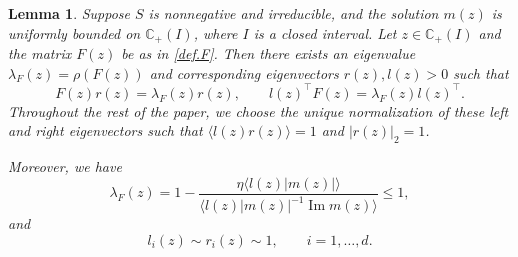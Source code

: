 \documentclass[11pt,twoside, a4paper]{article}
\numberwithin{equation}{section}
\numberwithin{figure}{section}
\theoremstyle{plain} %
\newtheorem{lemma}[theorem]{Lemma}
\theoremstyle{definition}
\theoremstyle{remark}
\newcommand{\1} {\mspace{1 mu}}
\newcommand{\2} {\mspace{2 mu}}
\newcommand{\C} {{\mathbb{C}}}
\newcommand{\Cp} {\mathbb {C}_+}
\DeclareMathOperator{\im}{Im}
\begin{document}
\begin{lemma}\label{lem:F-PF}
  Suppose $S$ is nonnegative and irreducible, and the solution $m(z)$ is uniformly bounded on $\C_+(I)$, where $I$ is a closed interval. Let $z\in\Cp(I)$ and the matrix $F(z)$ be as in \eqref{def.F}.
  Then there exists an eigenvalue $\lambda_F(z)=\rho(F(z))$ and corresponding eigenvectors $r(z),l(z)>0$ such that
  \begin{equation}\label{eq:left-right-eigenvector}
    F(z)r(z)=\lambda_F(z)r(z),\qquad l(z)^\top F(z)=\lambda_F(z) l(z)^\top.
  \end{equation}
  Throughout the rest of the paper, we choose the unique normalization of these left and right eigenvectors such that
  $\langle l(z) r(z)\rangle=1$ and $|r(z)|_2=1$.
  
  Moreover, we have
  \begin{equation}\label{eq.F-eigenvalue}
    \lambda_F(z)=1-\frac{\eta\langle l(z)|m(z)|\rangle}{\langle l(z)|m(z)|^{-1}\im m(z)\rangle}\le 1,
  \end{equation}
  and
  \begin{equation}\label{eq.vector-comparable}
    l_i(z)\sim r_i(z)\sim 1,\qquad i=1,\dots,d.
  \end{equation}
\end{lemma}
\end{document}
